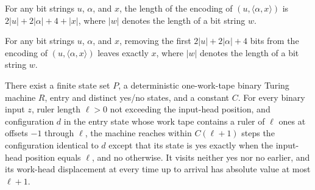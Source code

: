 \begin{theorem}
\label{Turing.pairEncode_pairEncode_length}
\leanok
{}
For any bit strings $u$, $\alpha$, and $x$, the length of the encoding of
$(u,\langle\alpha,x\rangle)$ is $2|u|+2|\alpha|+4+|x|$, where $|w|$ denotes the length
of a bit string $w$.
\end{theorem}

\begin{theorem}
\label{Turing.pairEncode_pairEncode_drop}
\leanok
{}
For any bit strings $u$, $\alpha$, and $x$, removing the first $2|u|+2|\alpha|+4$ bits
from the encoding of $(u,\langle\alpha,x\rangle)$ leaves exactly $x$, where $|w|$
denotes the length of a bit string $w$.
\end{theorem}

\begin{theorem}
\label{Turing.exists_rulerTestTM}
\leanok
{}
There exist a finite state set $P$, a deterministic one-work-tape binary Turing machine
$R$, entry and distinct yes/no states, and a constant $C$. For every binary input $z$,
ruler length $\ell>0$ not exceeding the input-head position, and configuration $d$ in
the entry state whose work tape contains a ruler of $\ell$ ones at offsets $-1$ through
$\ell$, the machine reaches within $C(\ell+1)$ steps the configuration identical to $d$
except that its state is yes exactly when the input-head position equals $\ell$, and no
otherwise. It visits neither yes nor no earlier, and its work-head displacement at every
time up to arrival has absolute value at most $\ell+1$.
\end{theorem}

